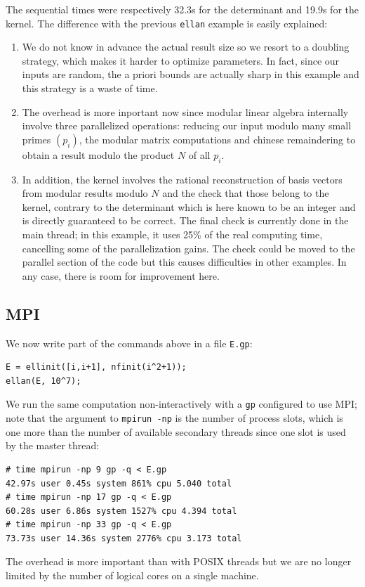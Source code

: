 \documentclass{deliverablereport}
\begin{document}
\noindent
The sequential times were respectively 32.3s for the determinant and
19.9s for the kernel. The difference with the previous \texttt{ellan} example
is easily explained:
\begin{enumerate}
  \item We do not know in advance the actual result size so we resort to a
    doubling strategy, which makes it harder to optimize parameters.
    In fact, since our inputs are random, the a priori bounds are actually
    sharp in this example and this strategy is a waste of time.

  \item The overhead is more inportant now since modular linear algebra
    internally involve three parallelized operations: reducing our input
    modulo many small primes $(p_i)$, the modular matrix computations and
    chinese remaindering to obtain a result modulo the product $N$ of all $p_i$.

  \item In addition, the kernel involves the rational reconstruction of basis
    vectors from modular results modulo $N$ and the check that those belong
    to the kernel, contrary to the determinant which is here known to be an
    integer and is directly guaranteed to be correct. The final check is
    currently done in the main thread; in this example, it uses 25\% of the
    real computing time, cancelling some of the parallelization gains.
    The check could be moved to the parallel section of the code but this
    causes difficulties in other examples. In any case, there is room for
    improvement here.
\end{enumerate}

\subsection{MPI}

We now write part of the commands above in a file \texttt{E.gp}:
\begin{verbatim}
E = ellinit([i,i+1], nfinit(i^2+1));
ellan(E, 10^7);
\end{verbatim}
We run the same computation non-interactively with a \texttt{gp} configured
to use MPI; note that the argument to \texttt{mpirun -np} is the number of
process slots, which is one more than the number of available secondary
threads since one slot is used by the master thread:
\begin{verbatim}
# time mpirun -np 9 gp -q < E.gp
42.97s user 0.45s system 861% cpu 5.040 total
# time mpirun -np 17 gp -q < E.gp
60.28s user 6.86s system 1527% cpu 4.394 total
# time mpirun -np 33 gp -q < E.gp
73.73s user 14.36s system 2776% cpu 3.173 total
\end{verbatim}
The overhead is more important than with POSIX
threads but we are no longer limited by the number of logical cores on a
single machine.
\end{document}
